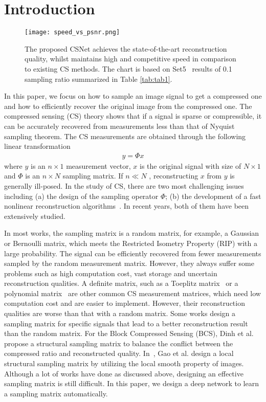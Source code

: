 \documentclass[5pt]{article}
\begin{document}
\section{Introduction}
\label{sec:intro}

\begin{figure}[t]
\centering
\texttt{[image: speed\_vs\_psnr.png]}
\vspace{-10pt}
\caption{\small {The proposed CSNet achieves the state-of-the-art reconstruction quality, whilst maintains high and competitive speed in comparison to existing CS methods. The chart is based on Set5~\cite{rf23} results of 0.1 sampling ratio summarized in Table \ref{tab:tab1}.}}
\vspace{-15pt}
\label{fig:fig1}
\end{figure}

In this paper, we focus on how to sample an image signal to get a compressed one and how to efficiently recover the original image from the compressed one. The compressed sensing (CS) theory shows that if a signal is sparse or compressible, it can be accurately recovered from measurements less than that of Nyquist sampling theorem. The CS measurements are obtained through the following linear transformation
\begin{eqnarray}
y = \Phi x
\end{eqnarray}
where $y$ is an $n \times 1$  measurement vector, $x$ is the original signal with size of $N \times 1$  and $\Phi $  is an $n \times N$  sampling matrix. If $n \ll N$ , reconstructing $x$ from $y$ is generally ill-posed. In the study of CS, there are two most challenging issues including (a) the design of the sampling operator $\Phi$; (b) the development of a fast nonlinear reconstruction algorithms~\cite{rf1}. In recent years, both of them have been extensively studied.

In most works, the sampling matrix is a random matrix, for example, a Gaussian or Bernoulli matrix, which meets the Restricted Isometry Property (RIP) with a large probability. The signal can be efficiently recovered from fewer measurements sampled by the random measurement matrix. However, they always suffer some problems such as high computation cost, vast storage and uncertain reconstruction qualities. A definite matrix, such as a Toeplitz matrix~\cite{rf2} or a polynomial matrix~\cite{rf3} are other common CS measurement matrices, which need low computation cost and are easier to implement. However, their reconstruction qualities are worse than that with a random matrix. Some works design a sampling matrix for specific signals that lead to a better reconstruction result than the random matrix. For the Block Compressed Sensing (BCS), Dinh et al.~\cite{rf4} propose a structural sampling matrix to balance the conflict between the compressed ratio and reconstructed quality. In~\cite{rf5}, Gao et al. design a local structural sampling matrix by utilizing the local smooth property of images. Although a lot of works have done as discussed above, designing an effective sampling matrix is still difficult. In this paper, we design a deep network to learn a sampling matrix automatically.
\end{document}
